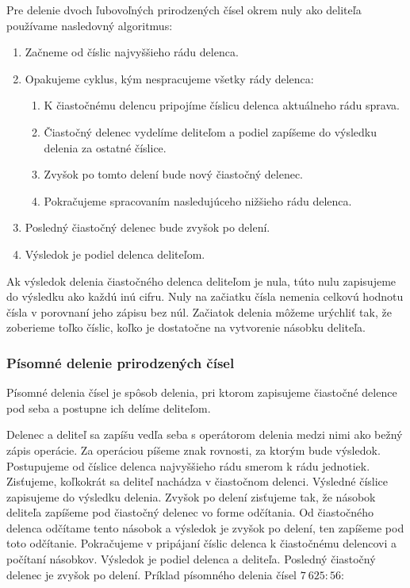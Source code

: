 \documentclass{report}
\begin{document}
Pre delenie dvoch ľubovoľných prirodzených čísel okrem nuly ako deliteľa používame nasledovný algoritmus:
\begin{enumerate}[label=\arabic*)]
  \item Začneme od číslic najvyššieho rádu delenca.
  \item Opakujeme cyklus, kým nespracujeme všetky rády delenca:
  \begin{enumerate}
    \item K čiastočnému delencu pripojíme číslicu delenca aktuálneho rádu sprava.
    \item Čiastočný delenec vydelíme deliteľom a podiel zapíšeme do výsledku delenia za ostatné číslice.
    \item Zvyšok po tomto delení bude nový čiastočný delenec.
    \item Pokračujeme spracovaním nasledujúceho nižšieho rádu delenca.
  \end{enumerate}
  \item Posledný čiastočný delenec bude zvyšok po delení.
  \item Výsledok je podiel delenca deliteľom.
\end{enumerate}
Ak výsledok delenia čiastočného delenca deliteľom je nula, túto nulu zapisujeme do výsledku ako každú inú cifru. Nuly na začiatku čísla nemenia celkovú hodnotu čísla v porovnaní jeho zápisu bez núl. Začiatok delenia môžeme urýchliť tak, že zoberieme toľko číslic, koľko je dostatočne na vytvorenie násobku deliteľa. 

\subsubsection{Písomné delenie prirodzených čísel}

Písomné delenia čísel je spôsob delenia, pri ktorom zapisujeme čiastočné delence pod seba a postupne ich delíme deliteľom.

Delenec a deliteľ sa zapíšu vedľa seba s operátorom delenia medzi nimi ako bežný zápis operácie. Za operáciou píšeme znak rovnosti, za ktorým bude výsledok. Postupujeme od číslice delenca najvyššieho rádu smerom k rádu jednotiek. Zisťujeme, koľkokrát sa deliteľ nachádza v čiastočnom delenci. Výsledné číslice zapisujeme do výsledku delenia. Zvyšok po delení zisťujeme tak, že násobok deliteľa zapíšeme pod čiastočný delenec vo forme odčítania. Od čiastočného delenca odčítame tento násobok a výsledok je zvyšok po delení, ten zapíšeme pod toto odčítanie. Pokračujeme v pripájaní číslic delenca k čiastočnému delencovi a počítaní násobkov. Výsledok je podiel delenca a deliteľa. Posledný čiastočný delenec je zvyšok po delení.
Príklad písomného delenia čísel \(7\ 625 : 56\):
\end{document}
